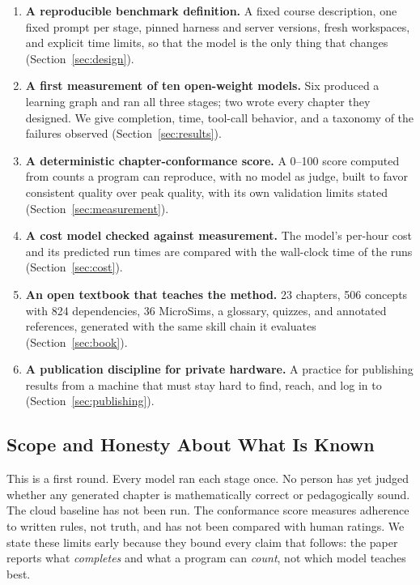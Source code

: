 \begin{enumerate}
\item \textbf{A reproducible benchmark definition.} A fixed course description, one fixed prompt per stage, pinned harness and server versions, fresh workspaces, and explicit time limits, so that the model is the only thing that changes (Section~\ref{sec:design}).

\item \textbf{A first measurement of ten open-weight models.} Six produced a learning graph and ran all three stages; two wrote every chapter they designed. We give completion, time, tool-call behavior, and a taxonomy of the failures observed (Section~\ref{sec:results}).

\item \textbf{A deterministic chapter-conformance score.} A 0--100 score computed from counts a program can reproduce, with no model as judge, built to favor consistent quality over peak quality, with its own validation limits stated (Section~\ref{sec:measurement}).

\item \textbf{A cost model checked against measurement.} The model's per-hour cost and its predicted run times are compared with the wall-clock time of the runs (Section~\ref{sec:cost}).

\item \textbf{An open textbook that teaches the method.} 23 chapters, 506 concepts with 824 dependencies, 36 MicroSims, a glossary, quizzes, and annotated references, generated with the same skill chain it evaluates (Section~\ref{sec:book}).

\item \textbf{A publication discipline for private hardware.} A practice for publishing results from a machine that must stay hard to find, reach, and log in to (Section~\ref{sec:publishing}).
\end{enumerate}

\subsection{Scope and Honesty About What Is Known}

This is a first round. Every model ran each stage once. No person has yet judged whether any generated chapter is mathematically correct or pedagogically sound. The cloud baseline has not been run. The conformance score measures adherence to written rules, not truth, and has not been compared with human ratings. We state these limits early because they bound every claim that follows: the paper reports what \textit{completes} and what a program can \textit{count}, not which model teaches best.

